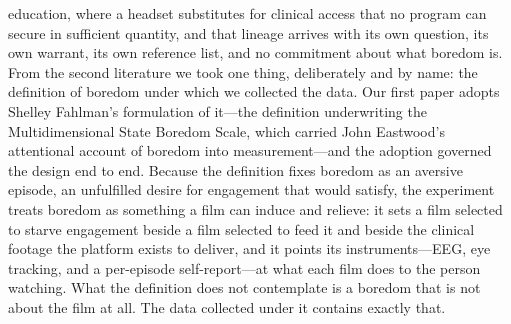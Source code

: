 education, where a headset substitutes for clinical access that no program can secure in
sufficient quantity, and that lineage arrives with its own question, its own warrant, its own
reference list, and no commitment about what boredom is. From the second literature we took
one thing, deliberately and by name: the definition of boredom under which we collected the
data. Our first paper adopts Shelley Fahlman's formulation of it---the definition
underwriting the Multidimensional State Boredom Scale, which carried John Eastwood's
attentional account of boredom into measurement---and the adoption governed the design end to
end. Because the definition fixes boredom as an aversive episode, an unfulfilled desire for
engagement that would satisfy, the experiment treats boredom as something a film can induce
and relieve: it sets a film selected to starve engagement beside a film selected to feed it
and beside the clinical footage the platform exists to deliver, and it points its
instruments---EEG, eye tracking, and a per-episode self-report---at what each film does to
the person watching. What the definition does not contemplate is a boredom that is not about
the film at all. The data collected under it contains exactly that.

